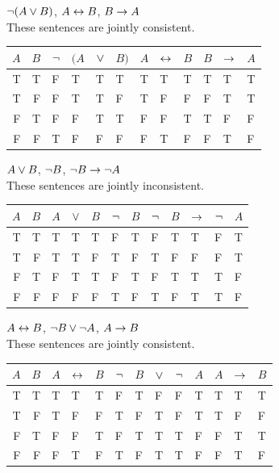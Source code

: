 \begin{earg}
\item ${\neg}(A \vee B)$, $A \leftrightarrow B$, $B \rightarrow A$\\
These sentences are jointly consistent.
\begin{flushleft}
\begin{tabular}{d d | f e e h | f  e  h | f  e  e }
$A$ & $B$ & ${\neg}$ & $(A$ & $\vee$ & $B)$ & $A$ & $\leftrightarrow$ & $B$ & $B$ & $\rightarrow$ & $A$\\
\hline
T & T &  F &   T & T & T &     T & T &  T &     T & T & T\Tstrut\\
T & F &  F &   T & T & F &     T & F &  F &      F & T & T\\   
F & T &  F &   F & T & T &     F & F &  T &      T & F & F\\
F & F &  T &   F & F & F &     F & T &  F &      F & T & F 
\end{tabular}
\end{flushleft}\medskip

\item $A \vee B$, ${\neg} B$, ${\neg} B \rightarrow {\neg} A$\\
These sentences are jointly inconsistent.
\begin{flushleft}
\begin{tabular}{d d |  f  e  h  | f  h | f  e  e  e  e}
$A$ & $B$ & $A$ & $\vee$ & $B$ & ${\neg}$ & $B$ & ${\neg}$ & $B$ & $\rightarrow$ & ${\neg}$ & $A$\\
\hline
T & T &    T & T & T &   F & T &    F & T & T & F & T\Tstrut\\
T & F &    T & T & F &   T & F &    T & F & F & F & T\\   
F & T &    F & T & T &   F & T &    F & T & T & T & F\\
F & F &    F & F & F &   T & F &    T & F & T & T & F
\end{tabular}
\end{flushleft}\medskip

\item $A \leftrightarrow B$, ${\neg} B \vee {\neg} A$, $A \rightarrow B$\\
These sentences are jointly consistent. 
\begin{flushleft}
\begin{tabular}{d d | f  e  h  | f e e e h | f e e}
$A$ & $B$ & $A$ & $\leftrightarrow$ & $B$ & ${\neg}$ & $B$ & $\vee$ & ${\neg}$ & $A$ & $A$ & $\rightarrow$ & $B$\\
\hline
T & T &    T & T &  T &     F & T & F & F & T &      T & T & T\Tstrut\\
T & F &    T & F &  F &     T & F & T & F & T &      T & F & F\\
F & T &    F & F &  T &     F & T & T & T & F &      F & T & T\\
F & F &    F & T &  F &     T & F & T & T & F &      F & T & F
\end{tabular}
\end{flushleft}\medskip


\end{earg}
